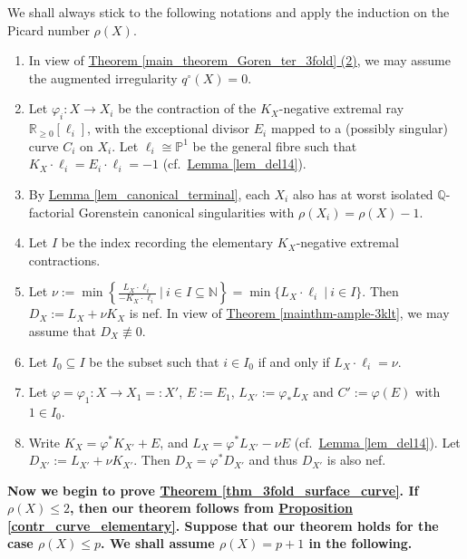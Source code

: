 \begin{notation}\label{not_bir_surface_curve}
We shall always stick to the following notations 
 and apply the induction on the Picard number $\rho(X)$. 
\begin{enumerate}
\item[(1)] In view of {\hyperref[main_theorem_Goren_ter_3fold]{Theorem   \ref*{main_theorem_Goren_ter_3fold} (2)}}, we may assume the augmented irregularity $q^\circ(X)=0$.
\item[(2)] Let $\varphi_i:X\to X_i$ be the contraction of the $K_X$-negative extremal ray $\mathbb{R}_{\geqslant 0}[\ell_i]$, with the exceptional divisor $E_i$ mapped to a (possibly singular) curve $C_i$ on $X_i$. 
Let $\ell_i\cong\mathbb{P}^1$ be the general fibre such that $K_X\cdot\ell_i=E_i\cdot \ell_i=-1$ (cf.~{\hyperref[lem_del14]{Lemma  \ref*{lem_del14}}}).
\item[(3)] By {\hyperref[lem_canonical_terminal]{Lemma  \ref*{lem_canonical_terminal}}}, each $X_i$ also has at worst isolated $\mathbb{Q}$-factorial Gorenstein canonical singularities  with $\rho(X_i)=\rho(X)-1$.
\item[(4)] Let $I$ be the index recording the elementary $K_X$-negative extremal contractions.
\item[(5)] Let $\nu:=\min\left\{\frac{L_X\cdot\ell_i}{-K_X\cdot\ell_i}~|~i\in I\subseteq\mathbb{N}\right\}=\min\{L_X\cdot\ell_i~|~i\in I\}$.
Then $D_X:=L_X+\nu K_X$ is nef.
In view of {\hyperref[mainthm-ample-3klt]{Theorem \ref*{mainthm-ample-3klt}}}, we may assume that $D_X\not\equiv 0$.
\item[(6)] Let $I_0\subseteq I$ be the subset such that $i\in I_0$ if and only if $L_X\cdot \ell_i=\nu$.
\item[(7)] Let $\varphi=\varphi_1:X\to X_1=:X'$, $E:=E_1$, $L_{X'}:=\varphi_*L_X$ and $C':=\varphi(E)$ with $1\in I_0$. 
\item[(8)] Write $K_X=\varphi^*K_{X'}+E$, and $L_X=\varphi^*L_{X'}-\nu E$ (cf.~{\hyperref[lem_del14]{Lemma  \ref*{lem_del14}}}).
Let $D_{X'}:=L_{X'}+\nu K_{X'}$.
Then $D_X=\varphi^*D_{X'}$ and thus $D_{X'}$ is also nef.
\end{enumerate}	
\end{notation}


\textbf{Now we begin to prove {\hyperref[thm_3fold_surface_curve]{Theorem \ref*{thm_3fold_surface_curve}}}. 
If $\rho(X)\leqslant 2$, then our theorem follows from {\hyperref[contr_curve_elementary]{Proposition   \ref*{contr_curve_elementary}}}.
Suppose that our theorem holds for the case $\rho(X)\leqslant p$.
We shall assume $\rho(X)=p+1$ in the following.}



